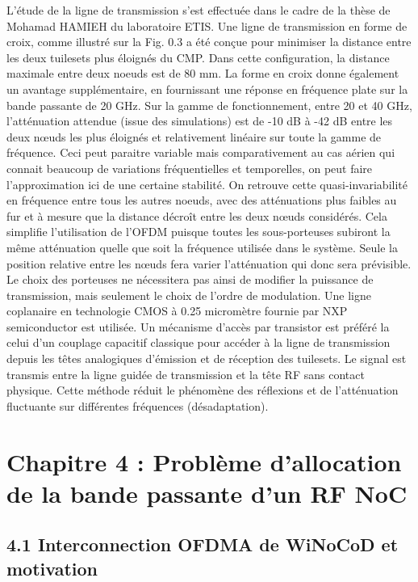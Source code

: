 L’étude de la ligne de transmission s’est effectuée dans le cadre de la thèse de Mohamad HAMIEH du laboratoire ETIS. Une ligne de transmission en forme de croix, comme illustré sur la Fig. 0.3 a été conçue pour minimiser la distance entre les deux tuilesets plus éloignés du CMP. Dans cette configuration, la distance maximale entre deux noeuds est de 80 mm. La forme en croix donne également un avantage supplémentaire, en fournissant une réponse en fréquence plate sur la bande passante de 20 GHz. Sur la gamme de fonctionnement, entre 20 et 40 GHz, l'atténuation attendue (issue des simulations) est de -10 dB à -42 dB entre les deux nœuds les plus éloignés et relativement linéaire sur toute la gamme de fréquence. Ceci peut paraitre variable mais comparativement au cas aérien qui connait beaucoup de variations fréquentielles et temporelles, on peut faire l'approximation ici de une certaine stabilité. On retrouve cette quasi-invariabilité en fréquence entre tous les autres noeuds, avec des atténuations plus faibles au fur et à mesure que la distance décroît entre les deux nœuds considérés. Cela simplifie l'utilisation de l’OFDM puisque toutes les sous-porteuses subiront la même atténuation quelle que soit la fréquence utilisée dans le système. Seule la position relative entre les nœuds fera varier l’atténuation qui donc sera prévisible.  Le choix des porteuses ne nécessitera pas ainsi de modifier la puissance de transmission, mais seulement le choix de l’ordre de modulation. Une ligne coplanaire en technologie CMOS à 0.25 micromètre fournie par NXP semiconductor est utilisée. Un mécanisme d'accès par transistor est préféré la celui d'un couplage capacitif classique pour accéder à la ligne de transmission depuis les têtes analogiques d’émission et de réception  des tuilesets. Le signal est transmis entre la ligne guidée de transmission et la tête RF sans contact physique. Cette méthode réduit le phénomène des réflexions  et de l'atténuation fluctuante sur différentes fréquences (désadaptation). 


\section*{Chapitre 4 : Problème d'allocation de la bande passante d’un RF NoC}

\subsection*{4.1 Interconnection OFDMA de WiNoCoD et motivation}

